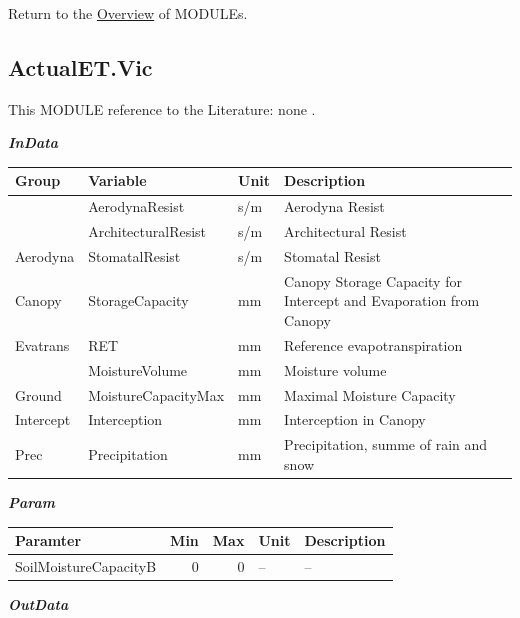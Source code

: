 \documentclass[
]{book}
\begin{document}
Return to the \protect\hyperlink{module}{Overview} of MODULEs.

\hypertarget{ActualET.Vic}{%
\subsection{ActualET.Vic}\label{ActualET.Vic}}

This MODULE reference to the Literature: none \citep{none}.

\textbf{\emph{InData}}

\begin{table}[!h]
\centering
\begin{tabular}{l|l|l|l}
\hline
Group & Variable & Unit & Description\\
\hline
 & AerodynaResist & s/m & Aerodyna Resist\\
\cline{2-4}
 & ArchitecturalResist & s/m & Architectural Resist\\
\cline{2-4}
\multirow{-3}{*}{\raggedright\arraybackslash Aerodyna} & StomatalResist & s/m & Stomatal Resist\\
\cline{1-4}
Canopy & StorageCapacity & mm & Canopy Storage Capacity for Intercept and Evaporation from Canopy\\
\cline{1-4}
Evatrans & RET & mm & Reference evapotranspiration\\
\cline{1-4}
 & MoistureVolume & mm & Moisture volume\\
\cline{2-4}
\multirow{-2}{*}{\raggedright\arraybackslash Ground} & MoistureCapacityMax & mm & Maximal Moisture Capacity\\
\cline{1-4}
Intercept & Interception & mm & Interception in Canopy\\
\cline{1-4}
Prec & Precipitation & mm & Precipitation, summe of rain and snow\\
\hline
\end{tabular}
\end{table}

\textbf{\emph{Param}}

\begin{table}[!h]
\centering
\begin{tabular}{l|r|r|l|l}
\hline
Paramter & Min & Max & Unit & Description\\
\hline
SoilMoistureCapacityB & 0 & 0 & -- & --\\
\hline
\end{tabular}
\end{table}

\textbf{\emph{OutData}}
\end{document}
